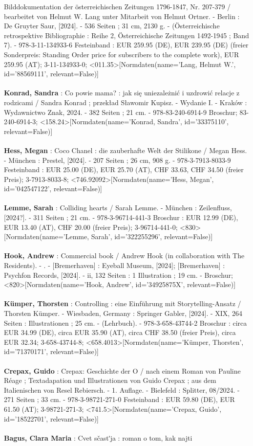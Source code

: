 \documentclass{article}
\begin{document}
\begin{multicols}{3}
Bilddokumentation der österreichischen Zeitungen 1796-1847, Nr. 207-379 / bearbeitet von Helmut W. Lang unter Mitarbeit von Helmut Ortner. - Berlin : De Gruyter Saur, [2024]. - 536 Seiten ; 31 cm, 2130 g. - (Österreichische retrospektive Bibliographie : Reihe 2, Österreichische Zeitungen 1492-1945 ; Band 7). - 978-3-11-134933-6 Festeinband : EUR 259.95 (DE), EUR 239.95 (DE) (freier Sonderpreis: Standing Order price for subscribers to the complete work), EUR 259.95 (AT); 3-11-134933-0; <011.35>[Normdaten(name='Lang, Helmut W.', id='88569111', relevant=False)]\\\\\textbf{Konrad, Sandra} : Co powie mama? : jak się uniezależnić i uzdrowić relacje z rodzicami / Sandra Konrad ; przekład Sławomir Kupisz. - Wydanie I. - Kraków : Wydawnictwo Znak, 2024. - 382 Seiten ; 21 cm. - 978-83-240-6914-9 Broschur; 83-240-6914-3; <158.24>[Normdaten(name='Konrad, Sandra', id='33375110', relevant=False)]\\\\\textbf{Hess, Megan} : Coco Chanel : die zauberhafte Welt der Stilikone / Megan Hess. - München : Prestel, [2024]. - 207 Seiten ; 26 cm, 908 g. - 978-3-7913-8033-9 Festeinband  : EUR 25.00 (DE), EUR 25.70 (AT), CHF 33.63, CHF 34.50 (freier Preis); 3-7913-8033-8; <746.92092>[Normdaten(name='Hess, Megan', id='042547122', relevant=False)]\\\\\textbf{Lemme, Sarah} : Colliding hearts / Sarah Lemme. - München : Zeilenfluss, [2024?]. - 311 Seiten ; 21 cm. - 978-3-96714-441-3 Broschur : EUR 12.99 (DE), EUR 13.40 (AT), CHF 20.00 (freier Preis); 3-96714-441-0; <830>[Normdaten(name='Lemme, Sarah', id='322255296', relevant=False)]\\\\\textbf{Hook, Andrew} : Commercial book / Andrew Hook (in collaboration with The Residents). - . - [Bremerhaven] : Eyeball Museum, [2024]; [Bremerhaven] : Psychfon Records, [2024]. - ii, 132 Seiten : 1 Illustration ; 19 cm. - Broschur; <820>[Normdaten(name='Hook, Andrew', id='34925875X', relevant=False)]\\\\\textbf{Kümper, Thorsten} : Controlling : eine Einführung mit Storytelling-Ansatz / Thorsten Kümper. - Wiesbaden, Germany : Springer Gabler, [2024]. - XIX, 264 Seiten : Illustrationen ; 25 cm. - (Lehrbuch). - 978-3-658-43744-2 Broschur : circa EUR 34.99 (DE), circa EUR 35.90 (AT), circa CHF 38.50 (freier Preis), circa EUR 32.34; 3-658-43744-8; <658.4013>[Normdaten(name='Kümper, Thorsten', id='71370171', relevant=False)]\\\\\textbf{Crepax, Guido} : Crepax: Geschichte der O / nach einem Roman von Pauline Réage ; Textadapation und Illustrationen von Guido Crepax ; aus dem Italienischen von Resel Rebiersch. - 1. Auflage. - Bielefeld : Splitter, 08/2024. - 271 Seiten ; 33 cm. - 978-3-98721-271-0 Festeinband : EUR 59.80 (DE), EUR 61.50 (AT); 3-98721-271-3; <741.5>[Normdaten(name='Crepax, Guido', id='18522701', relevant=False)]\\\\\textbf{Bagus, Clara Maria} : Cvet sčastʹja : roman o tom, kak najti 
\end{multicols}
\end{document}
